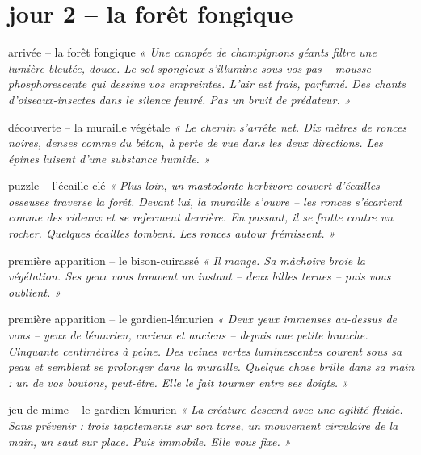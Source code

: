 \documentclass[10pt, a4paper]{article}
\begin{document}
\section*{jour 2 -- la forêt fongique}

\begin{zonebox}{arrivée -- la forêt fongique}
\textit{« Une canopée de champignons géants filtre une lumière bleutée, douce. Le sol spongieux s'illumine sous vos pas -- mousse phosphorescente qui dessine vos empreintes. L'air est frais, parfumé. Des chants d'oiseaux-insectes dans le silence feutré. Pas un bruit de prédateur. »}
\end{zonebox}

\begin{obstaclebox}{découverte -- la muraille végétale}
\textit{« Le chemin s'arrête net. Dix mètres de ronces noires, denses comme du béton, à perte de vue dans les deux directions. Les épines luisent d'une substance humide. »}
\end{obstaclebox}

\begin{puzzlebox}{puzzle -- l'écaille-clé}
\textit{« Plus loin, un mastodonte herbivore couvert d'écailles osseuses traverse la forêt. Devant lui, la muraille s'ouvre -- les ronces s'écartent comme des rideaux et se referment derrière. En passant, il se frotte contre un rocher. Quelques écailles tombent. Les ronces autour frémissent. »}
\end{puzzlebox}

\begin{creaturebox}{première apparition -- le bison-cuirassé}
\textit{« Il mange. Sa mâchoire broie la végétation. Ses yeux vous trouvent un instant -- deux billes ternes -- puis vous oublient. »}
\end{creaturebox}

\begin{creaturebox}{première apparition -- le gardien-lémurien}
\textit{« Deux yeux immenses au-dessus de vous -- yeux de lémurien, curieux et anciens -- depuis une petite branche. Cinquante centimètres à peine. Des veines vertes luminescentes courent sous sa peau et semblent se prolonger dans la muraille. Quelque chose brille dans sa main : un de vos boutons, peut-être. Elle le fait tourner entre ses doigts. »}
\end{creaturebox}

\begin{momentbox}{jeu de mime -- le gardien-lémurien}
\textit{« La créature descend avec une agilité fluide. Sans prévenir : trois tapotements sur son torse, un mouvement circulaire de la main, un saut sur place. Puis immobile. Elle vous fixe. »}
\end{momentbox}
\end{document}
